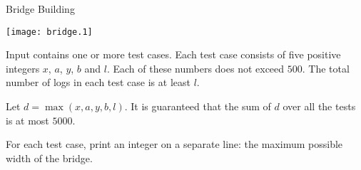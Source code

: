 \begin{problem}{Bridge Building}

\begin{center}
\texttt{[image: bridge.1]}
\end{center}

\InputFile

Input contains one or more test cases.
Each test case consists of five positive integers
$x$, $a$, $y$, $b$ and $l$.
Each of these numbers does not exceed $500$.
The total number of logs in each test case is at least $l$.


Let $d = \max (x, a, y, b, l)$.
It is guaranteed that the sum of $d$ over all the tests is at most $5000$.


\OutputFile

For each test case, print an integer on a separate line:
the maximum possible width of the bridge.


\Example

\begin{example}
%
\end{example}

\end{problem}
